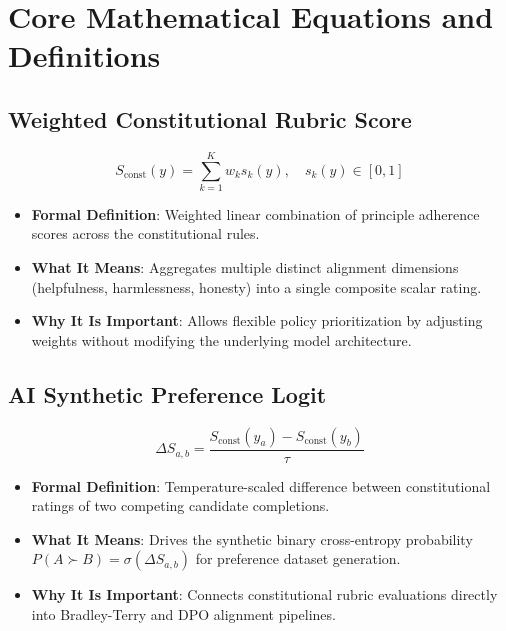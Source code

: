 \documentclass[11pt,a4paper]{article}
\theoremstyle{definition}
\begin{document}
\section{Core Mathematical Equations and Definitions}

\subsection{Weighted Constitutional Rubric Score}
{\boldmath
\begin{equation}
S_{\text{const}}(y) = \sum_{k=1}^K w_k s_k(y), \quad s_k(y) \in [0, 1]
\end{equation}
}
\begin{itemize}
    \item \textbf{Formal Definition}: Weighted linear combination of principle adherence scores across the constitutional rules.
    \item \textbf{What It Means}: Aggregates multiple distinct alignment dimensions (helpfulness, harmlessness, honesty) into a single composite scalar rating.
    \item \textbf{Why It Is Important}: Allows flexible policy prioritization by adjusting weights without modifying the underlying model architecture.
\end{itemize}

\subsection{AI Synthetic Preference Logit}
{\boldmath
\begin{equation}
\Delta S_{a, b} = \frac{S_{\text{const}}(y_a) - S_{\text{const}}(y_b)}{\tau}
\end{equation}
}
\begin{itemize}
    \item \textbf{Formal Definition}: Temperature-scaled difference between constitutional ratings of two competing candidate completions.
    \item \textbf{What It Means}: Drives the synthetic binary cross-entropy probability $P(A \succ B) = \sigma(\Delta S_{a, b})$ for preference dataset generation.
    \item \textbf{Why It Is Important}: Connects constitutional rubric evaluations directly into Bradley-Terry and DPO alignment pipelines.
\end{itemize}
\end{document}
